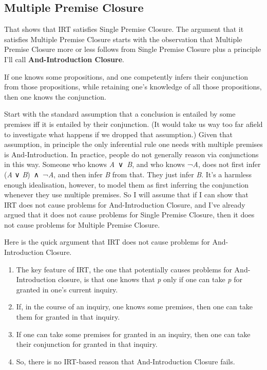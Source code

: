 \documentclass[
  10pt,
  letterpaper,
  twoside]{scrbook}
\providecommand{\tightlist}{%
  \setlength{\itemsep}{0pt}\setlength{\parskip}{0pt}}\usepackage{longtable,booktabs,array}
\begin{document}
\subsection{Multiple Premise Closure}\label{sec-andintro}

That shows that IRT satisfies Single Premise Closure. The argument that
it satisfies Multiple Premise Closure starts with the observation that
Multiple Premise Closure more or less follows from Single Premise
Closure plus a principle I'll call \textbf{And-Introduction Closure}.

\begin{description}
\tightlist
\item[And-Introduction Closure]
If one knows some propositions, and one competently infers their
conjunction from those propositions, while retaining one's knowledge of
all those propositions, then one knows the conjunction.
\end{description}

Start with the standard assumption that a conclusion is entailed by some
premises iff it is entailed by their conjunction. (It would take us way
too far afield to investigate what happens if we dropped that
assumption.) Given that assumption, in principle the only inferential
rule one needs with multiple premises is And-Introduction. In practice,
people do not generally reason via conjunctions in this way. Someone who
knows \emph{A}~∨~\emph{B}, and who knows ¬\emph{A}, does not first infer
(\emph{A} ∨ \emph{B})~∧~¬\emph{A}, and then infer \emph{B} from that.
They just infer \emph{B}. It's a harmless enough idealisation, however,
to model them as first inferring the conjunction whenever they use
multiple premises. So I will assume that if I can show that IRT does not
cause problems for And-Introduction Closure, and I've already argued
that it does not cause problems for Single Premise Closure, then it does
not cause problems for Multiple Premise Closure.

Here is the quick argument that IRT does not cause problems for
And-Introduction Closure.

\begin{enumerate}
\def\labelenumi{\arabic{enumi}.}
\tightlist
\item
  The key feature of IRT, the one that potentially causes problems for
  And-Introduction closure, is that one knows that \emph{p} only if one
  can take \emph{p} for granted in one's current inquiry.
\item
  If, in the course of an inquiry, one knows some premises, then one can
  take them for granted in that inquiry.
\item
  If one can take some premises for granted in an inquiry, then one can
  take their conjunction for granted in that inquiry.
\item
  So, there is no IRT-based reason that And-Introduction Closure fails.
\end{enumerate}
\end{document}
